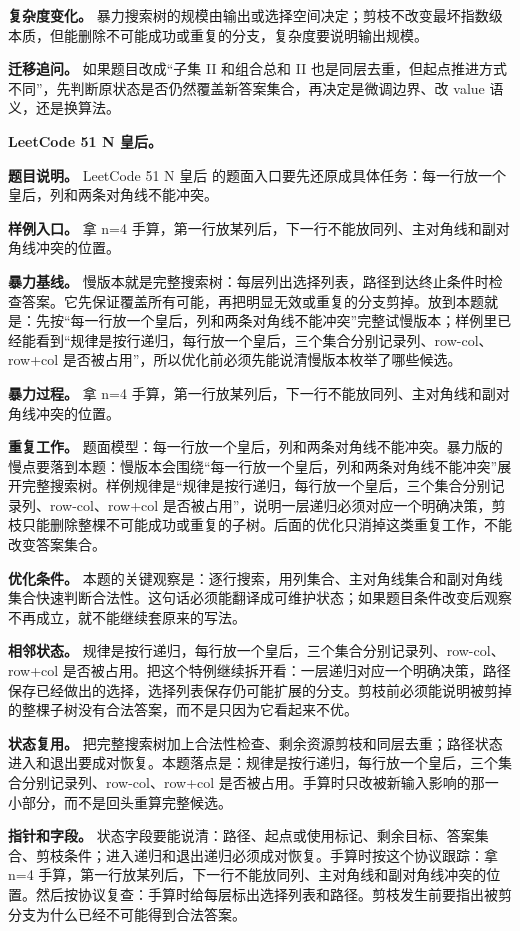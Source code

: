 \textbf{复杂度变化。} 暴力搜索树的规模由输出或选择空间决定；剪枝不改变最坏指数级本质，但能删除不可能成功或重复的分支，复杂度要说明输出规模。

\textbf{迁移追问。} 如果题目改成“子集 II 和组合总和 II 也是同层去重，但起点推进方式不同”，先判断原状态是否仍然覆盖新答案集合，再决定是微调边界、改 value 语义，还是换算法。

\noindent\textbf{LeetCode 51 N 皇后。}

\textbf{题目说明。} LeetCode 51 N 皇后 的题面入口要先还原成具体任务：每一行放一个皇后，列和两条对角线不能冲突。

\textbf{样例入口。} 拿 n=4 手算，第一行放某列后，下一行不能放同列、主对角线和副对角线冲突的位置。

\textbf{暴力基线。} 慢版本就是完整搜索树：每层列出选择列表，路径到达终止条件时检查答案。它先保证覆盖所有可能，再把明显无效或重复的分支剪掉。放到本题就是：先按“每一行放一个皇后，列和两条对角线不能冲突”完整试慢版本；样例里已经能看到“规律是按行递归，每行放一个皇后，三个集合分别记录列、row-col、row+col 是否被占用”，所以优化前必须先能说清慢版本枚举了哪些候选。

\textbf{暴力过程。} 拿 n=4 手算，第一行放某列后，下一行不能放同列、主对角线和副对角线冲突的位置。

\textbf{重复工作。} 题面模型：每一行放一个皇后，列和两条对角线不能冲突。暴力版的慢点要落到本题：慢版本会围绕“每一行放一个皇后，列和两条对角线不能冲突”展开完整搜索树。样例规律是“规律是按行递归，每行放一个皇后，三个集合分别记录列、row-col、row+col 是否被占用”，说明一层递归必须对应一个明确决策，剪枝只能删除整棵不可能成功或重复的子树。后面的优化只消掉这类重复工作，不能改变答案集合。

\textbf{优化条件。} 本题的关键观察是：逐行搜索，用列集合、主对角线集合和副对角线集合快速判断合法性。这句话必须能翻译成可维护状态；如果题目条件改变后观察不再成立，就不能继续套原来的写法。

\textbf{相邻状态。} 规律是按行递归，每行放一个皇后，三个集合分别记录列、row-col、row+col 是否被占用。把这个特例继续拆开看：一层递归对应一个明确决策，路径保存已经做出的选择，选择列表保存仍可能扩展的分支。剪枝前必须能说明被剪掉的整棵子树没有合法答案，而不是只因为它看起来不优。

\textbf{状态复用。} 把完整搜索树加上合法性检查、剩余资源剪枝和同层去重；路径状态进入和退出要成对恢复。本题落点是：规律是按行递归，每行放一个皇后，三个集合分别记录列、row-col、row+col 是否被占用。手算时只改被新输入影响的那一小部分，而不是回头重算完整候选。

\textbf{指针和字段。} 状态字段要能说清：路径、起点或使用标记、剩余目标、答案集合、剪枝条件；进入递归和退出递归必须成对恢复。手算时按这个协议跟踪：拿 n=4 手算，第一行放某列后，下一行不能放同列、主对角线和副对角线冲突的位置。然后按协议复查：手算时给每层标出选择列表和路径。剪枝发生前要指出被剪分支为什么已经不可能得到合法答案。

